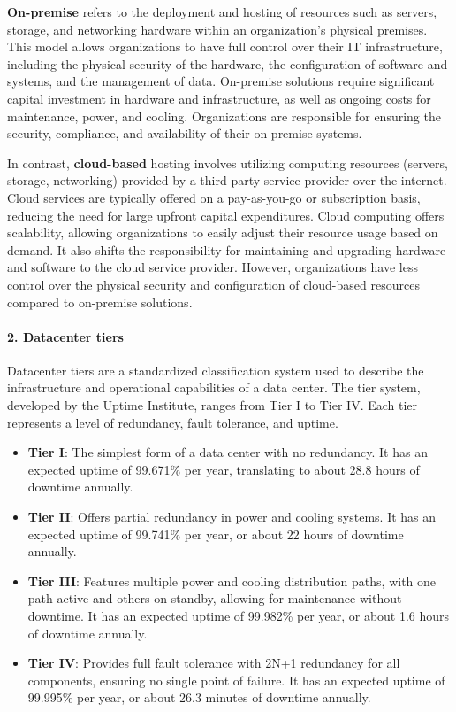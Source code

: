 \documentclass[10pt, landscape]{article}
\begin{document}
\begin{multicols*}{4}
\textbf{On-premise} refers to the deployment and hosting of resources
such as servers, storage, and networking hardware within an
organization's physical premises. This model allows organizations to
have full control over their IT infrastructure, including the physical
security of the hardware, the configuration of software and systems, and
the management of data. On-premise solutions require significant capital
investment in hardware and infrastructure, as well as ongoing costs for
maintenance, power, and cooling. Organizations are responsible for
ensuring the security, compliance, and availability of their on-premise
systems.

In contrast, \textbf{cloud-based} hosting involves utilizing computing
resources (servers, storage, networking) provided by a third-party
service provider over the internet. Cloud services are typically offered
on a pay-as-you-go or subscription basis, reducing the need for large
upfront capital expenditures. Cloud computing offers scalability,
allowing organizations to easily adjust their resource usage based on
demand. It also shifts the responsibility for maintaining and upgrading
hardware and software to the cloud service provider. However,
organizations have less control over the physical security and
configuration of cloud-based resources compared to on-premise solutions.

\paragraph{2. Datacenter tiers}\label{datacenter-tiers}

Datacenter tiers are a standardized classification system used to
describe the infrastructure and operational capabilities of a data
center. The tier system, developed by the Uptime Institute, ranges from
Tier I to Tier IV. Each tier represents a level of redundancy, fault
tolerance, and uptime.

\begin{itemize}
\tightlist
\item
  \textbf{Tier I}: The simplest form of a data center with no
  redundancy. It has an expected uptime of 99.671\% per year,
  translating to about 28.8 hours of downtime annually.
\item
  \textbf{Tier II}: Offers partial redundancy in power and cooling
  systems. It has an expected uptime of 99.741\% per year, or about 22
  hours of downtime annually.
\item
  \textbf{Tier III}: Features multiple power and cooling distribution
  paths, with one path active and others on standby, allowing for
  maintenance without downtime. It has an expected uptime of 99.982\%
  per year, or about 1.6 hours of downtime annually.
\item
  \textbf{Tier IV}: Provides full fault tolerance with 2N+1 redundancy
  for all components, ensuring no single point of failure. It has an
  expected uptime of 99.995\% per year, or about 26.3 minutes of
  downtime annually.
\end{itemize}


\end{multicols*}
\end{document}
